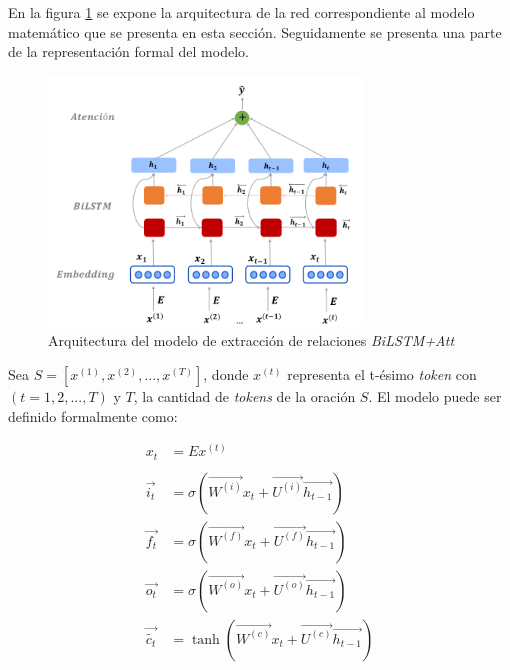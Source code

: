 En la figura \ref{bilstm} se expone la arquitectura de la red correspondiente al modelo matemático que se presenta en esta sección. Seguidamente se presenta una parte de la representación formal del modelo.

\begin{figure}[!tb]
  \begin{center}
    \includegraphics[angle=0, width=0.75\textwidth]{Graphics/bilstm.png}
  \end{center}
    \caption{Arquitectura del modelo de extracción de relaciones \textit{BiLSTM+Att}}\label{bilstm}
\end{figure}

Sea $S = [x^{(1)}, x^{(2)}, ..., x^{(T)}]$, donde $x^{(t)}$ representa el t-ésimo \textit{token} con $(t = 1, 2, ..., T)$ y $T$, la cantidad de \textit{tokens} de la oración $S$. El modelo puede ser definido formalmente como:

\begin{align}
  x_{t} &= Ex^{(t)} \label{bilstm:emb}\\
  \nonumber \\
  \overrightarrow{i_{t}} &= \sigma{(\overrightarrow{W^{(i)}} x_{t} + \overrightarrow{U^{(i)}}\overrightarrow{h_{t-1}})} \label{bilstm:ig} \\
  \overrightarrow{f_{t}} &= \sigma{(\overrightarrow{W^{(f)}} x_{t} + \overrightarrow{U^{(f)}}\overrightarrow{h_{t-1}})} \label{bilstm:fg} \\
  \overrightarrow{o_{t}} &= \sigma{(\overrightarrow{W^{(o)}} x_{t} + \overrightarrow{U^{(o)}}\overrightarrow{h_{t-1}})} \label{bilstm:og} \\
  \overrightarrow{\tilde{c_{t}}} &= \tanh(\overrightarrow{W^{(c)}} x_{t} + \overrightarrow{U^{(c)}}\overrightarrow{h_{t-1}}) \label{bilstm:new_memory_cell}
\end{align}

